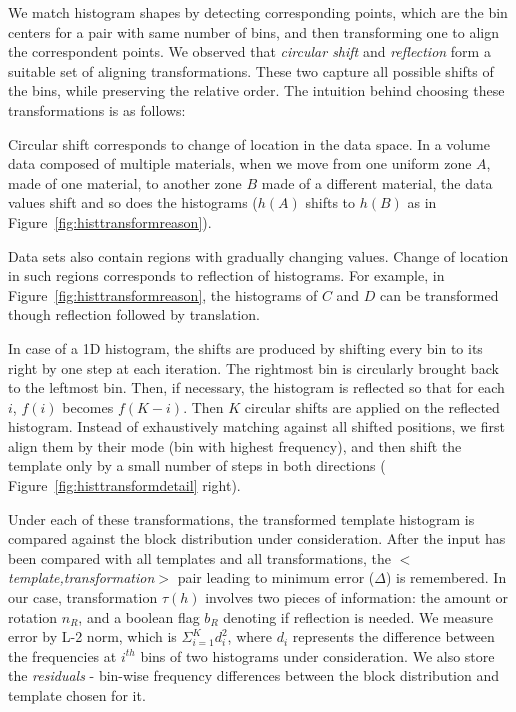 We match histogram shapes by detecting corresponding points, which are the bin centers for a pair with same number of bins, and then transforming one to align the correspondent points. We observed that \emph{circular shift} and \emph{reflection} form a suitable set of aligning transformations. These two capture all possible shifts of the bins, while preserving the relative order. The intuition behind choosing these transformations is as follows:
\begin{packed_itemize}
\item Circular shift corresponds to change of location in the data space. In a volume data composed of multiple materials, when we move from one uniform zone $A$, made of one material, to another zone $B$ made of a different material, the data values shift and so does the histograms ($h(A)$ shifts to $h(B)$ as in Figure~\ref{fig:histtransformreason}). 
\item Data sets also contain regions with gradually changing values. Change of location in such regions corresponds to reflection of histograms. For example, in Figure~\ref{fig:histtransformreason}, the histograms of $C$ and $D$ can be transformed though reflection followed by translation.
\end{packed_itemize}
In case of a 1D histogram, the shifts are produced by shifting every bin to its right by one step at each iteration. The rightmost bin is circularly brought back to the leftmost bin. Then, if necessary, the histogram is reflected so that for each $i$, $f(i)$ becomes $f(K-i)$. Then $K$ circular shifts are applied on the reflected histogram. Instead of exhaustively matching against all shifted positions, we first align them by their mode (bin with highest frequency), and then shift the template only by a small number of steps in both directions ( Figure~\ref{fig:histtransformdetail} right). 

Under each of these transformations, the transformed template histogram is compared against the block distribution under consideration. After the input has been compared with all templates and all transformations, the $<$\emph{template,transformation}$>$ pair leading to minimum error ($\Delta$) is remembered. In our case, transformation $\tau (h)$ involves two pieces of information: the amount or rotation $n_R$, and a boolean flag $b_R$ denoting if reflection is needed. We measure error by L-2 norm, which is $\Sigma_{i=1}^K d_i^2$, where $d_i$ represents the difference between the frequencies at $i^{th}$ bins of two histograms under consideration. We also store the \emph{residuals} - bin-wise frequency differences between the block distribution and template chosen for it. 
